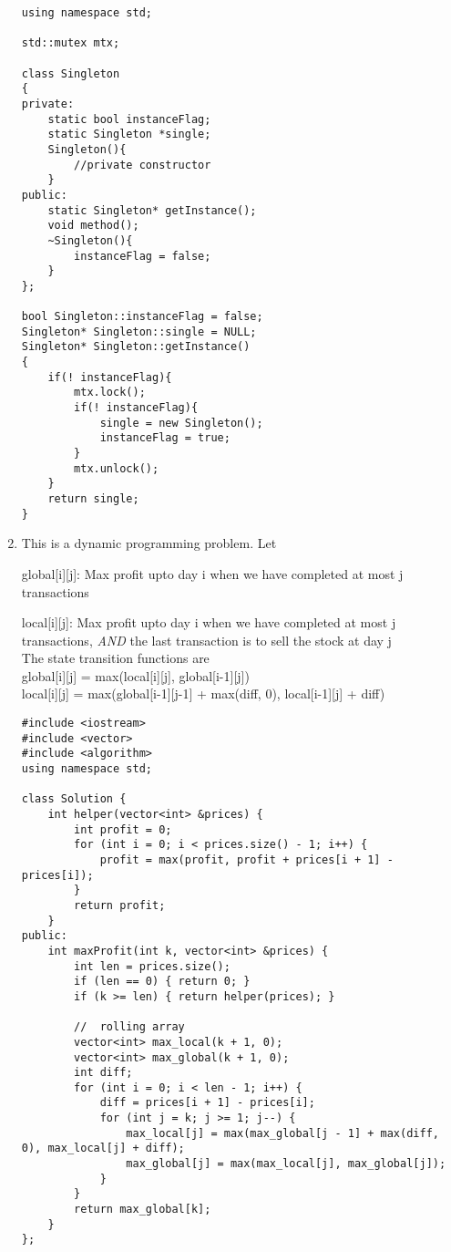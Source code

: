 \documentclass[10pt, onecolumn, draftcls]{IEEEtran}
\begin{document}
\begin{enumerate}
\begin{lstlisting}
using namespace std;

std::mutex mtx;

class Singleton
{
private:
    static bool instanceFlag;
    static Singleton *single;
    Singleton(){
        //private constructor
    }
public:
    static Singleton* getInstance();
    void method();
    ~Singleton(){
        instanceFlag = false;
    }
};

bool Singleton::instanceFlag = false;
Singleton* Singleton::single = NULL;
Singleton* Singleton::getInstance()
{
    if(! instanceFlag){
        mtx.lock();
        if(! instanceFlag){
            single = new Singleton();
            instanceFlag = true;
        }
        mtx.unlock();        
    }
    return single;
}
\end{lstlisting}

\item
 This is a dynamic programming problem. Let 
\par global[i][j]: Max profit upto day i when we have completed at most j transactions
\par local[i][j]: Max profit upto day i when we have completed at most j transactions, \emph{AND} the last transaction is to sell the stock at day j\\
The state transition functions are\\
global[i][j] = max(local[i][j], global[i-1][j]) \\ 
local[i][j] = max(global[i-1][j-1] + max(diff, 0), local[i-1][j] + diff) 

\begin{lstlisting}
#include <iostream>
#include <vector>
#include <algorithm>
using namespace std;

class Solution {
    int helper(vector<int> &prices) {
        int profit = 0;
        for (int i = 0; i < prices.size() - 1; i++) {
            profit = max(profit, profit + prices[i + 1] - prices[i]);
        }
        return profit;
    }
public:
    int maxProfit(int k, vector<int> &prices) {
        int len = prices.size();
        if (len == 0) { return 0; }
        if (k >= len) { return helper(prices); }

        //  rolling array
        vector<int> max_local(k + 1, 0);
        vector<int> max_global(k + 1, 0);
        int diff;
        for (int i = 0; i < len - 1; i++) {
            diff = prices[i + 1] - prices[i];
            for (int j = k; j >= 1; j--) {
                max_local[j] = max(max_global[j - 1] + max(diff, 0), max_local[j] + diff);
                max_global[j] = max(max_local[j], max_global[j]);
            }
        }
        return max_global[k];
    }
};
\end{lstlisting}


\end{enumerate}
\end{document}
